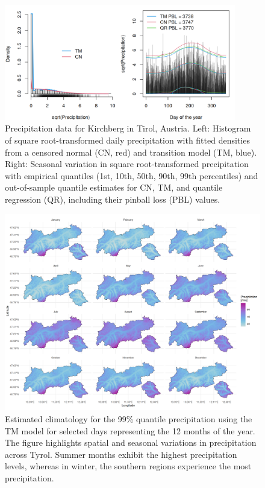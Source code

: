 \documentclass[english,a4paper,11pt]{article}
\begin{document}
\begin{figure}[!ht]
\centering
\includegraphics[width=0.9\textwidth]{ts_hist.png}
\caption{\label{fig:Kirchberg} Precipitation data for Kirchberg in Tirol, Austria.
  Left: Histogram of square root-transformed daily precipitation with fitted densities from a
  censored normal (CN, red) and transition model (TM, blue).
  Right: Seasonal variation in square root-transformed precipitation with empirical quantiles
  (1st, 10th, 50th, 90th, 99th percentiles) and out-of-sample quantile estimates for CN, TM, and
  quantile regression (QR), including their pinball loss (PBL) values.}
\end{figure}
\begin{figure}[!h]
\centering
\includegraphics[width=1\textwidth]{predictions.png}
\caption{\label{fig:clim} Estimated climatology for the 99\% quantile precipitation using
  the TM model for selected days representing the 12 months of the year. The figure
  highlights spatial and seasonal variations in precipitation across Tyrol. Summer
  months exhibit the highest precipitation levels, whereas in winter, the southern
  regions experience the most precipitation.}
\end{figure}
\end{document}
